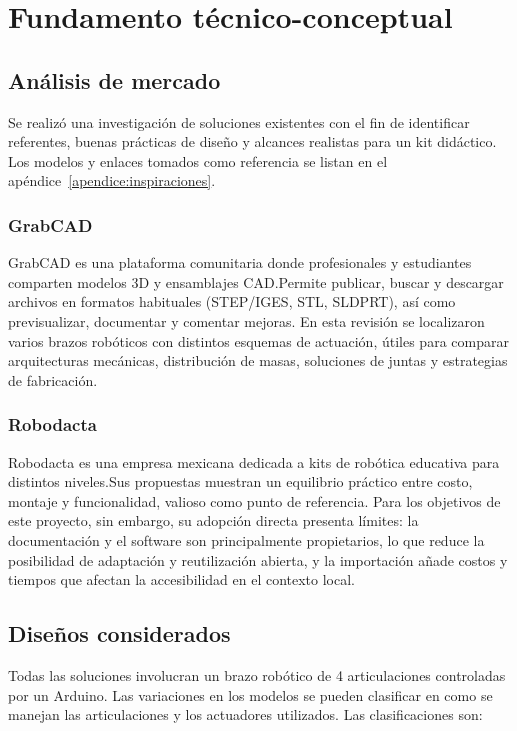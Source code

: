 \section{Fundamento técnico-conceptual}

\subsection{Análisis de mercado}
Se realizó una investigación de soluciones existentes con el fin de identificar referentes, buenas prácticas de diseño y alcances realistas para un kit didáctico. Los modelos y enlaces tomados como referencia se listan en el apéndice~\ref{apendice:inspiraciones}.

\subsubsection{GrabCAD}
GrabCAD es una plataforma comunitaria donde profesionales y estudiantes comparten modelos 3D y ensamblajes CAD.\@ Permite publicar, buscar y descargar archivos en formatos habituales (STEP/IGES, STL, SLDPRT), así como previsualizar, documentar y comentar mejoras. En esta revisión se localizaron varios brazos robóticos con distintos esquemas de actuación, útiles para comparar arquitecturas mecánicas, distribución de masas, soluciones de juntas y estrategias de fabricación.

\subsubsection{Robodacta}
Robodacta es una empresa mexicana dedicada a kits de robótica educativa para distintos niveles.\@ Sus propuestas muestran un equilibrio práctico entre costo, montaje y funcionalidad, valioso como punto de referencia. Para los objetivos de este proyecto, sin embargo, su adopción directa presenta límites: la documentación y el software son principalmente propietarios, lo que reduce la posibilidad de adaptación y reutilización abierta, y la importación añade costos y tiempos que afectan la accesibilidad en el contexto local.



\subsection{Diseños considerados}
Todas las soluciones involucran un brazo robótico de 4 articulaciones controladas por un Arduino. Las variaciones en los modelos se pueden clasificar en como se manejan las articulaciones y los actuadores utilizados. Las clasificaciones son:

